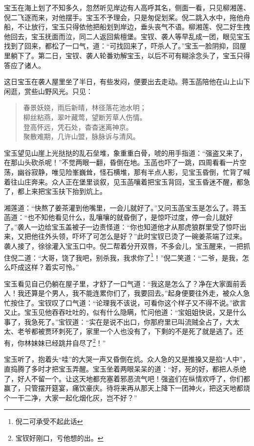 \documentclass[12pt,oneside]{book}
\newenvironment{shici}{%
\begin{verse}%
\centering\large\hspace{12pt}}%
{\end{verse}}
\begin{document}
宝玉在海上划了不知多久，忽然听见岸边有人高呼其名，侧面一看，只见柳湘莲、倪二飞逐而来，对他摆手。宝玉不予理会，只是匆促划桨。倪二跳入水中，拖他舟船，不让放行，宝玉只得依他把船划到岸边，垂头丧气不语。柳湘莲、倪二好生拽他回去，宝玉抚面而泣，同二人返回紫檀堡。宝钗、袭人等早乱成一团，眼见宝玉找到了回来，都松了一口气，道：“可找回来了，吓杀人了。”宝玉一脸阴抑，回屋里躺下了。第二日，宝钗、袭人轮番劝解宝玉，以后不可有糊涂念头了，宝玉只得答应了诸人。

这日宝玉在袭人屋里坐了半日，有些发闷，便要出去走动。蒋玉菡陪他在山上山下闲逛，赏些山野风光。只见：

\begin{shici}
春景妖娆，雨后新晴，林径落花池水明；\\
柳丝粘燕，翠叶藏莺，望断芳草人伤情。\\
登高怀远，凭石处，杳杳迷离神京。\\
聚散难期，几许山盟，脉脉诉与清风。
\end{shici}


宝玉望见山崖上光挞挞的乱石垒堆，象重重白骨，唬的用手指道：“强盗又来了，在那山头砍杀呢！”不觉两眼一翻，昏倒在地。玉菡也吓了一跳，四周看看一片空荡，幽谷寂静，唯见险峯巍耸，怪石横堆，那有半点人影，见宝玉昏倒，忙背了喊着往山庄奔来。众人正在堡里谈叙，见玉菡嚷着把宝玉背回，宝玉昏迷不醒，都急了，都上来把宝玉扶下抬到炕上。

湘莲道：“快熬了姜茶灌到他嘴里，一会儿就好了。”又问玉菡宝玉是怎么了。蒋玉菡道：“也不知他看见什么，乱嚷嚷的就昏倒了，是惊吓过度，停一会儿就好了。”袭人一边给宝玉盖被子一边责怪道：“你也知道他才从那虎狼群里受了惊吓出来，又把他往外头领，吓坏了可怎么是好？”此时宝钗已烫了一碗姜茶端了过来。袭人接了，徐徐灌入宝玉口中。倪二帮着分开双唇，不多会儿，宝玉醒来，一把抓住倪二道：“大哥，饶了我吧，别杀我，我求你了\footnote{倪二可承受不起此话}！”倪二笑道：“二爷，是我，怎么吓成这样？着实可怜。”

宝玉看见自己仍躺在屋子里，才舒了一口气道：“我这是怎么了？净在大家面前丢人！我还算是个男人，我不能连累你们了，我要回去。”起身便要往外走，被众人急忙按住了。宝钗叹了口气道：“论理我不该说，可看你这个样子又不得不说。”欲言又止。宝玉见他吞吞吐吐的，似有什么隐瞒，忙问他道：“宝姐姐快说，又是什么事了，我急死了。”宝钗道：“实在是说不出口，你那府里已叫流贼全占了，大太太、老爷都被贾环刺死了，家里一个人也没有了，下剩的不是死了就是逃了。还有，你林妹妹已经跳井自尽了\footnote{宝钗好刚口，亏他想的出。}！”

宝玉听了，抱着头“哇”的大哭一声又昏倒在炕。众人急的又是推搡又是掐“人中”，直捣腾了多时才把宝玉弄醒。宝玉坐着两眼呆呆的道：“好，死的好，都把人杀绝了，好人不留一个。让这天地都充塞着邪恶流气吧！强盗们在纵情欢呼了，你们都赢了，只管摆开筵宴，痛饮豪庆。待将来再从那天上降下一团神火，把这天地都烧个一干二净，大家一起化烟化灰，岂不好？”
\end{document}
